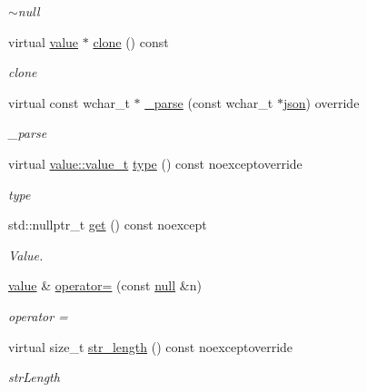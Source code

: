 \begin{DoxyCompactItemize}
\begin{DoxyCompactList}\small\item\em $\sim$null \end{DoxyCompactList}\item 
virtual \hyperlink{classformat_1_1value_aa6b85823936bf7b8ab78d3f8d443c00d}{value} $\ast$ \hyperlink{classformat_1_1null_a5a36484f97cd8795e42981f8c30181c2}{clone} () const 
\begin{DoxyCompactList}\small\item\em clone \end{DoxyCompactList}\item 
virtual const wchar\+\_\+t $\ast$ \hyperlink{classformat_1_1null_a7cb0c2e0582c244746f2dafb8712e19a}{\+\_\+parse} (const wchar\+\_\+t $\ast$\hyperlink{classformat_1_1json}{json}) override
\begin{DoxyCompactList}\small\item\em \+\_\+parse \end{DoxyCompactList}\item 
virtual \hyperlink{classformat_1_1value_aa0334be06389a7b14af485fa0cd3aa21}{value\+::value\+\_\+t} \hyperlink{classformat_1_1null_a3878d16875e190e0f319bf6f600883c9}{type} () const noexceptoverride
\begin{DoxyCompactList}\small\item\em type \end{DoxyCompactList}\item 
std\+::nullptr\+\_\+t \hyperlink{classformat_1_1null_ae32163fe796ecb28e12afcbc6fa47ea4}{get} () const noexcept
\begin{DoxyCompactList}\small\item\em Value. \end{DoxyCompactList}\item 
\hyperlink{classformat_1_1value_aa6b85823936bf7b8ab78d3f8d443c00d}{value} \& \hyperlink{classformat_1_1null_a0d04f44f36c54d8192ac40aeb5540f41}{operator=} (const \hyperlink{classformat_1_1null}{null} \&n)
\begin{DoxyCompactList}\small\item\em operator = \end{DoxyCompactList}\item 
virtual size\+\_\+t \hyperlink{classformat_1_1null_ae5df2937bf5677e5894685ff47654642}{str\+\_\+length} () const noexceptoverride
\begin{DoxyCompactList}\small\item\em str\+Length \end{DoxyCompactList}\end{DoxyCompactItemize}
